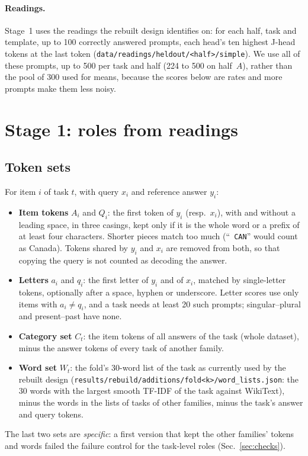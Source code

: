 \documentclass[10pt,a4paper]{article}
\newcommand{\p}[1]{``\texttt{#1}''}
\begin{document}
\paragraph{Readings.} Stage~1 uses the readings the rebuilt design identifies on: for each half, task and template, up to 100 correctly answered prompts, each head's ten highest J-head tokens at the last token (\texttt{data/readings/heldout/<half>/simple}). We use all of these prompts, up to 500 per task and half (224 to 500 on half~$A$), rather than the pool of 300 used for means, because the scores below are rates and more prompts make them less noisy.

\section{Stage 1: roles from readings}\label{sec:stage1}

\subsection{Token sets}\label{sec:sets}

For item $i$ of task $t$, with query $x_i$ and reference answer $y_i$:
\begin{itemize}
\item \textbf{Item tokens} $A_i$ and $Q_i$: the first token of $y_i$ (resp.\ $x_i$), with and without a leading space, in three casings, kept only if it is the whole word or a prefix of at least four characters. Shorter pieces match too much (\p{ CAN} would count as Canada). Tokens shared by $y_i$ and $x_i$ are removed from both, so that copying the query is not counted as decoding the answer.
\item \textbf{Letters} $a_i$ and $q_i$: the first letter of $y_i$ and of $x_i$, matched by single-letter tokens, optionally after a space, hyphen or underscore. Letter scores use only items with $a_i\neq q_i$, and a task needs at least 20 such prompts; singular--plural and present--past have none.
\item \textbf{Category set} $C_t$: the item tokens of all answers of the task (whole dataset), minus the answer tokens of every task of another family.
\item \textbf{Word set} $W_t$: the fold's 30-word list of the task as currently used by the rebuilt design (\texttt{results/rebuild/additions/fold<k>/word\_lists.json}: the 30 words with the largest smooth TF-IDF of the task against WikiText), minus the words in the lists of tasks of other families, minus the task's answer and query tokens.
\end{itemize}
The last two sets are \emph{specific}: a first version that kept the other families' tokens and words failed the failure control for the task-level roles (Sec.~\ref{sec:checks}).
\end{document}

